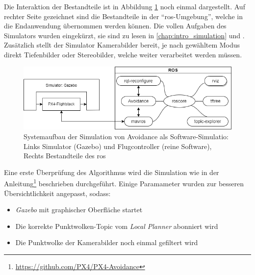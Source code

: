 Die Interaktion der Bestandteile ist in Abbildung \ref{fig:system_sim_origin} noch einmal dargestellt. Auf rechter Seite gezeichnet sind die Bestandteile in der \enquote{\acrshort{ros}-Umgebung}, welche in die Endanwendung übernommen werden können. Die vollen Aufgaben des Simulators wurden eingekürzt, sie sind zu lesen in \cref{chap:intro_simulation} und \cite[Kapitel 3.4.1]{markusreinErweiterungBestehenderDrohnen2023}. Zusätzlich stellt der Simulator Kamerabilder bereit, je nach gewähltem Modus direkt Tiefenbilder oder Stereobilder, welche weiter verarbeitet werden müssen. 
\begin{figure}[!ht]
    \centering
    \includegraphics[width=\linewidth]{images/simulation_ros.drawio.png}
    \caption[Systemaufbau der Simulation von Avoidance als Software-Simulation]{Systemaufbau der Simulation von Avoidance als Software-Simulatio: Links Simulator (Gazebo) und Flugcontroller (reine Software), Rechts Bestandteile des \acrshort{ros}}
    \label{fig:system_sim_origin}
\end{figure}

Eine erste Überprüfung des Algorithmus wird die Simulation wie in der Anleitung\footnote{\url{https://github.com/PX4/PX4-Avoidance}\cite{dronecodestiftungObstacleDetectionAvoidance2023}} beschrieben durchgeführt. Einige Paramameter wurden zur besseren Übersichtlichkeit angepasst, sodass:
\begin{itemize}
    \item \textit{Gazebo} mit graphischer Oberfläche startet
    \item Die korrekte Punktwolken-Topic vom \textit{Local Planner} abonniert wird
    \item Die Punktwolke der Kamerabilder noch einmal gefiltert wird
\end{itemize} 

